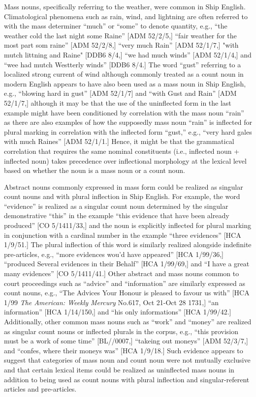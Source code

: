 Mass nouns, specifically referring to the weather, were common in Ship English. Climatological phenomena such as rain, wind, and lightning are often referred to with the mass determiner “much” or “some” to denote quantity, e.g., “the weather cold the last night some Raine” [ADM 52/2/5,] “fair weather for the most part som raine” [ADM 52/2/8,] “very much Rain” [ADM 52/1/7,] "with mutch littning and Raine" [DDB6 8/4,] “we had much winds” [ADM 52/1/4,] and “wee had mutch Westterly winds” [DDB6 8/4.] The word “gust” referring to a localized strong current of wind although commonly treated as a count noun in modern English appears to have also been used as a mass noun in Ship English, e.g., “blowing hard in gust” [ADM 52/1/7] and “with Gust and Rain” [ADM 52/1/7,] although it may be that the use of the uninflected form in the last example might have been conditioned by correlation with the mass noun “rain” as there are also examples of how the supposedly mass noun “rain” is inflected for plural marking in correlation with the inflected form “gust,” e.g., “very hard gales with much Raines” [ADM 52/1/1.] Hence, it might be that the grammatical correlation that requires the same nominal constituents (i.e., inflected noun + inflected noun) takes precedence over inflectional morphology at the lexical level based on whether the noun is a mass noun or a count noun. 

Abstract nouns commonly expressed in mass form could be realized as singular count nouns and with plural inflection in Ship English. For example, the word “evidence” is realized as a singular count noun determined by the singular demonstrative “this” in the example “this evidence that have been already produced” [CO 5/1411/33,] and the noun is explicitly inflected for plural marking in conjunction with a cardinal number in the example “three evidences” [HCA 1/9/51.] The plural inflection of this word is similarly realized alongside indefinite pre-articles, e.g., “more evidences wou’d have appeared” [HCA 1/99/36,] “produced Several evidences in their Behalf” [HCA 1/99/69,] and “I have a great many evidences” [CO 5/1411/41.] Other abstract and mass nouns common to court proceedings such as “advice” and “information” are similarly expressed as count nouns, e.g., “The Advices Your Honour is pleased to favour us with” [HCA 1/99 \textit{The American: Weekly Mercury} No.617, Oct 21-Oct 28 1731,] “an information” [HCA 1/14/150,] and “his only informations” [HCA 1/99/42.] Additionally, other common mass nouns such as “work” and “money” are realized as singular count nouns or inflected plurals in the corpus, e.g., “this provision must be a work of some time” [BL/\citealt{Egerton2395}/0007,] “takeing out moneys” [ADM 52/3/7,] and “confes, where their moneys was” [HCA 1/9/18.] Such evidence appears to suggest that categories of mass noun and count noun were not mutually exclusive and that certain lexical items could be realized as uninflected mass nouns in addition to being used as count nouns with plural inflection and singular-referent articles and pre-articles. 

